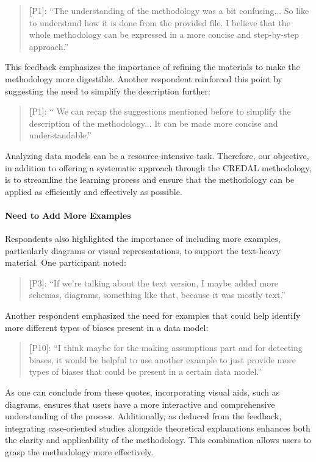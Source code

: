 \begin{quote}
    \textbf[P1]: ``The understanding of the methodology was a bit confusing... So like to understand how it is done from the provided file. I believe that the whole methodology can be expressed in a more concise and step-by-step approach.''  
\end{quote}

This feedback emphasizes the importance of refining the materials to make the methodology more digestible. Another respondent reinforced this point by suggesting the need to simplify the description further:

\begin{quote}
   \textbf[P1]: `` We can recap the suggestions mentioned before to simplify the description of the methodology... It can be made more concise and understandable.''
\end{quote}

Analyzing data models can be a resource-intensive task. Therefore, our objective, in addition to offering a systematic approach through the CREDAL methodology, is to streamline the learning process and ensure that the methodology can be applied as efficiently and effectively as possible.

\paragraph{Need to Add More Examples}
Respondents also highlighted the importance of including more examples, particularly diagrams or visual representations, to support the text-heavy material. One participant noted:

\begin{quote}
    \textbf[P3]: ``If we're talking about the text version, I maybe added more schemas, diagrams, something like that, because it was mostly text.''
\end{quote}

Another respondent emphasized the need for examples that could help identify more different types of biases present in a data model:

\begin{quote}
    \textbf[P10]: ``I think maybe for the making assumptions part and for detecting biases, it would be helpful to use another example to just provide more types of biases that could be present in a certain data model.''
\end{quote}

As one can conclude from these quotes, incorporating visual aids, such as diagrams, ensures that users have a more interactive and comprehensive understanding of the process. Additionally, as deduced from the feedback, integrating case-oriented studies alongside theoretical explanations enhances both the clarity and applicability of the methodology. This combination allows users to grasp the methodology more effectively.


